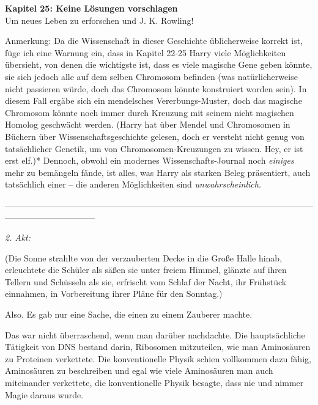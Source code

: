 

\hypertarget{keine-luxf6sungen-vorschlagen}{%

\textbf{Kapitel 25: Keine Lösungen vorschlagen}\\

\hfill\break Um neues Leben zu erforschen und J. K. Rowling!

Anmerkung: Da die Wissenschaft in dieser Geschichte üblicherweise korrekt ist, füge ich eine Warnung ein, dass in Kapitel 22-25 Harry viele Möglichkeiten übersieht, von denen die wichtigste ist, dass es viele magische Gene geben könnte, sie sich jedoch alle auf dem selben Chromosom befinden (was natürlicherweise nicht passieren würde, doch das Chromosom könnte konstruiert worden sein). In diesem Fall ergäbe sich ein mendelsches Vererbungs-Muster, doch das magische Chromosom könnte noch immer durch Kreuzung mit seinem nicht magischen Homolog geschwächt werden. (Harry hat über Mendel und Chromosomen in Büchern über Wissenschaftsgeschichte gelesen, doch er versteht nicht genug von tatsächlicher Genetik, um von Chromosomen-Kreuzungen zu wissen. Hey, er ist erst elf.)* Dennoch, obwohl ein modernes Wissenschafts-Journal noch \emph{einiges} mehr zu bemängeln fände, ist alles, was Harry als starken Beleg präsentiert, auch tatsächlich einer -- die anderen Möglichkeiten sind \emph{unwahrscheinlich.}

--------------------------------------------------------------------------------------------------------------------------------------------

\hfill\break \emph{2. Akt:}

(Die Sonne strahlte von der verzauberten Decke in die Große Halle hinab, erleuchtete die Schüler als säßen sie unter freiem Himmel, glänzte auf ihren Tellern und Schüsseln als sie, erfrischt vom Schlaf der Nacht, ihr Frühstück einnahmen, in Vorbereitung ihrer Pläne für den Sonntag.)

Also. Es gab nur eine Sache, die einen zu einem Zauberer machte.

Das war nicht überraschend, wenn man darüber nachdachte. Die hauptsächliche Tätigkeit von DNS bestand darin, Ribosomen mitzuteilen, wie man Aminosäuren zu Proteinen verkettete. Die konventionelle Physik schien vollkommen dazu fähig, Aminosäuren zu beschreiben und egal wie viele Aminosäuren man auch miteinander verkettete, die konventionelle Physik besagte, dass nie und nimmer Magie daraus wurde.

}
